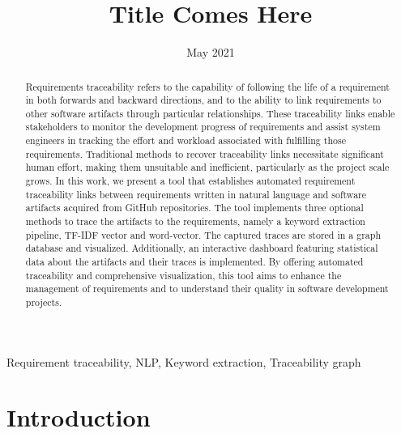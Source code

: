 \documentclass[conference]{IEEEtran}
\begin{document}
\title{Title Comes Here }
\author{
}

\date{May 2021}

\maketitle
\begin{abstract}
    Requirements traceability refers to the capability of following the life of a requirement in both forwards and backward directions, and to the ability to link requirements to other software artifacts through particular relationships. These traceability links enable stakeholders to monitor the development progress of requirements and assist system engineers in tracking the effort and workload associated with fulfilling those requirements. Traditional methods to recover traceability links necessitate significant human effort, making them unsuitable and inefficient, particularly as the project scale grows. In this work, we present a tool that establishes automated requirement traceability links between requirements written in natural language and software artifacts acquired from GitHub repositories. The tool implements three optional methods to trace the artifacts to the requirements, namely a keyword extraction pipeline, TF-IDF vector and word-vector. The captured traces are stored in a graph database and visualized. Additionally, an interactive dashboard featuring statistical data about the artifacts and their traces is implemented. By offering automated traceability and comprehensive visualization, this tool aims to enhance the management of requirements and to understand their quality in software development projects.
\end{abstract}
\begin{IEEEkeywords}
Requirement traceability, NLP, Keyword extraction, Traceability graph
\end{IEEEkeywords}

\section{Introduction} \label{section:introduction}
\end{document}
